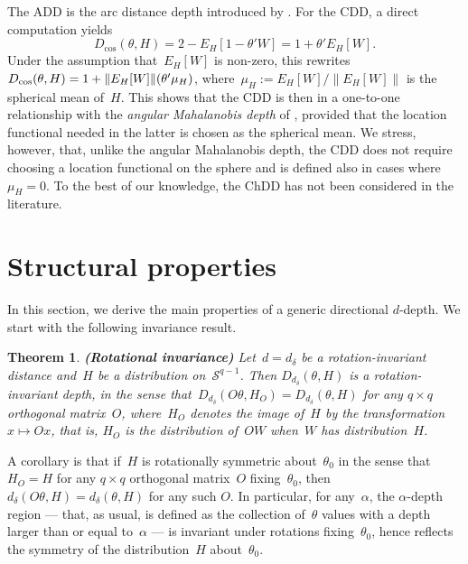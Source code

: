 \documentclass[usenames,dvipsnames]{article}
\newtheorem{thm}{Theorem}
\begin{document}
The ADD is the arc distance depth introduced by \cite{LiuSin1992}. For the CDD, a direct computation yields
\begin{equation}
	\label{cosinexplic}
D_{\cos}(\theta, H)
= 
2
- 
E_{H}[1-\theta' W]
= 
1
+ 
\theta' E_{H}[W]
.
\end{equation}
Under the assumption that~$E_{H}[W]$ is non-zero, this rewrites
$D_{\cos}(\theta, H) 
= 
1
+ 
\|E_{H}[W]\| 
\linebreak (\theta' \mu_H)
$,
where~$\mu_H:=E_{H}[W]/\|E_{H}[W]\|$ is the spherical mean of~$H$. This shows that the CDD is then in a one-to-one relationship with the \emph{angular Mahalanobis depth} of \cite{Leyetal2014}, provided that the location functional needed in the latter is chosen as the spherical mean. We stress, however, that, unlike the angular Mahalanobis depth, the CDD does not require choosing a location functional on the sphere and is defined also in cases where~$\mu_H=0$. To the best of our knowledge, the ChDD has not been considered in the literature. 


\section{Structural properties}
\label{sec:StructProperties}

In this section, we derive the main properties of a generic directional $d$-depth. We start with the following  invariance result. 

\begin{thm}{\textbf{(Rotational invariance)}} 
\label{thmrotainv}
Let~$d=d_\delta$ be a rotation-invariant distance and~$H$ be a distribution on~$\mathcal{S}^{q-1}$. Then $D_{d_{\delta}}(\theta, H)$ is a rotation-invariant depth, in the sense that~$D_{d_{\delta}}(O\theta, H_O)=D_{d_{\delta}}(\theta, H)$ for any $q\times q$ orthogonal matrix~$O$, where~$H_O$ denotes the image of~$H$ by the transformation~$x\mapsto Ox$, that is, $H_O$ is the distribution of~$OW$ when~$W$ has distribution~$H$.
\end{thm}

A corollary is that if~$H$ is rotationally symmetric about~$\theta_0$ in the sense that~$H_O=H$ for any $q\times q$ orthogonal matrix~$O$ fixing~$\theta_0$, then $d_\delta (O\theta,H)=d_\delta (\theta, H)$ for any such $O$. In particular, for any~$\alpha$, the $\alpha$-depth region --- that, as usual, is defined as the collection of~$\theta$ values with a depth larger than or equal to~$\alpha$ --- is invariant under rotations fixing~$\theta_0$, hence reflects the symmetry of the distribution~$H$ about~$\theta_0$. 
\end{document}
